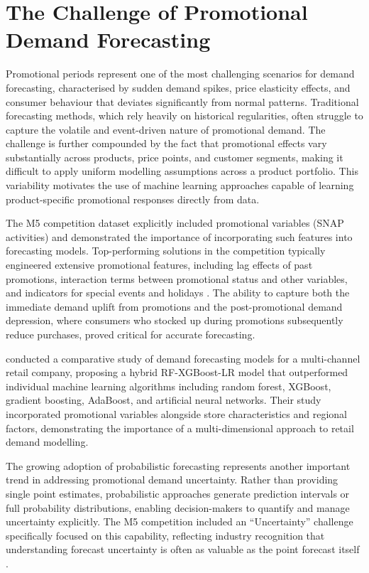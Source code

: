 \documentclass[ENG]{TFUOC}%
\begin{document}
\section{The Challenge of Promotional Demand Forecasting}

Promotional periods represent one of the most challenging scenarios for demand forecasting, characterised by sudden demand spikes, price elasticity effects, and consumer behaviour that deviates significantly from normal patterns. Traditional forecasting methods, which rely heavily on historical regularities, often struggle to capture the volatile and event-driven nature of promotional demand. The challenge is further compounded by the fact that promotional effects vary substantially across products, price points, and customer segments, making it difficult to apply uniform modelling assumptions across a product portfolio. This variability motivates the use of machine learning approaches capable of learning product-specific promotional responses directly from data.

The M5 competition dataset explicitly included promotional variables (SNAP activities) and demonstrated the importance of incorporating such features into forecasting models. Top-performing solutions in the competition typically engineered extensive promotional features, including lag effects of past promotions, interaction terms between promotional status and other variables, and indicators for special events and holidays \citep{makridakis2021m5}. The ability to capture both the immediate demand uplift from promotions and the post-promotional demand depression, where consumers who stocked up during promotions subsequently reduce purchases, proved critical for accurate forecasting.

\citet{mitra2022hybrid} conducted a comparative study of demand forecasting models for a multi-channel retail company, proposing a hybrid RF-XGBoost-LR model that outperformed individual machine learning algorithms including random forest, XGBoost, gradient boosting, AdaBoost, and artificial neural networks. Their study incorporated promotional variables alongside store characteristics and regional factors, demonstrating the importance of a multi-dimensional approach to retail demand modelling.

The growing adoption of probabilistic forecasting represents another important trend in addressing promotional demand uncertainty. Rather than providing single point estimates, probabilistic approaches generate prediction intervals or full probability distributions, enabling decision-makers to quantify and manage uncertainty explicitly. The M5 competition included an ``Uncertainty'' challenge specifically focused on this capability, reflecting industry recognition that understanding forecast uncertainty is often as valuable as the point forecast itself \citep{makridakis2021m5}.
\end{document}
